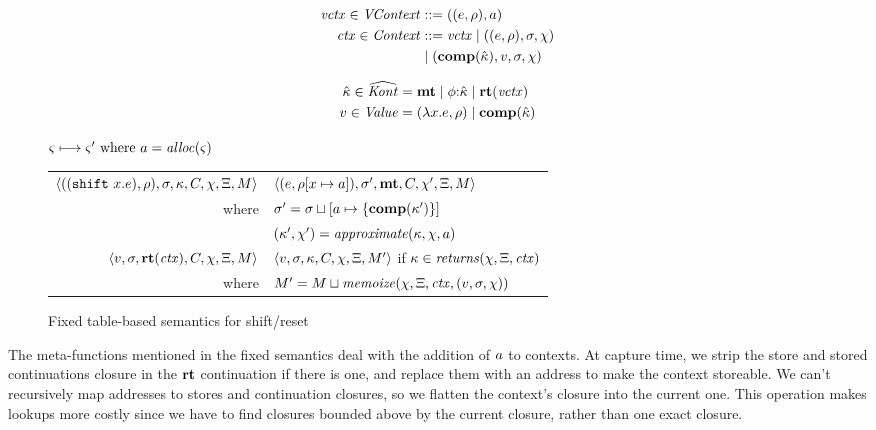\begin{center}
  \begin{minipage}{0.50\linewidth}
    \begin{align*}
      \mathit{vctx} \in \mathit{VContext} &::= ((e,\rho),a) \\
      \mathit{ctx} \in \mathit{Context} &::= \mathit{vctx} \mathrel{\mid}
      ((e,\rho),\sigma,\chi) \\ &\mathrel{\mid} (\mathbf{comp}(\hat{\kappa}),
      v, \sigma, \chi)
    \end{align*}
  \end{minipage}
  \begin{minipage}{0.45\linewidth}
    \begin{align*}
      \hat{\kappa} \in \widehat{\mathit{Kont}} &= \mathbf{mt} \mathrel{\mid} \phi{\tt :} \hat{\kappa} \mathrel{\mid} \mathbf{rt}(\mathit{vctx}) \\
      v \in \mathit{Value} &= (\lambda{} x. e, \rho) \mathrel{\mid}
      \mathbf{comp}(\hat{\kappa})
    \end{align*}
  \end{minipage}
\end{center}

\begin{figure}
  \centering
  $\varsigma \longmapsto \varsigma' \text{ where } a = \mathit{alloc}(\varsigma)$ \\
  \begin{tabular}{r|l}
    \hline
    $\langle ((\texttt{shift}\ x. e), \rho), \sigma, \kappa, C, \chi, \Xi, M \rangle$
    &
    $\langle (e, \rho[x \mapsto a]), \sigma',\mathbf{mt},C, \chi', \Xi,M \rangle$
    \\
    where & $\sigma' = \sigma\sqcup[a \mapsto \{ \mathbf{comp}(\kappa') \}]$ \\
    & $(\kappa',\chi') = \mathit{approximate}(\kappa, \chi, a)$
\\
   $\langle v, \sigma, \mathbf{rt}(\mathit{ctx}), C, \chi, \Xi, M \rangle$
   &
   $\langle v, \sigma, \kappa, C, \chi, \Xi, M' \rangle$
   if $\kappa \in \mathit{returns}(\chi, \Xi, \mathit{ctx})$
   \\
   where & $M' = M \sqcup \mathit{memoize}(\chi, \Xi, \mathit{ctx}, (v, \sigma, \chi))$
  \end{tabular}
  \caption{Fixed table-based semantics for shift/reset}
  \label{fig:shift-reset-table1}
\end{figure}

The meta-functions mentioned in the fixed semantics deal with the addition of $a$ to contexts.
%
At capture time, we strip the store and stored continuations closure in the $\mathbf{rt}$ continuation if there is one, and replace them with an address to make the context storeable.
%
We can't recursively map addresses to stores and continuation closures, so we flatten the context's closure into the current one.
%
This operation makes lookups more costly since we have to find closures bounded above by the current closure, rather than one exact closure.

